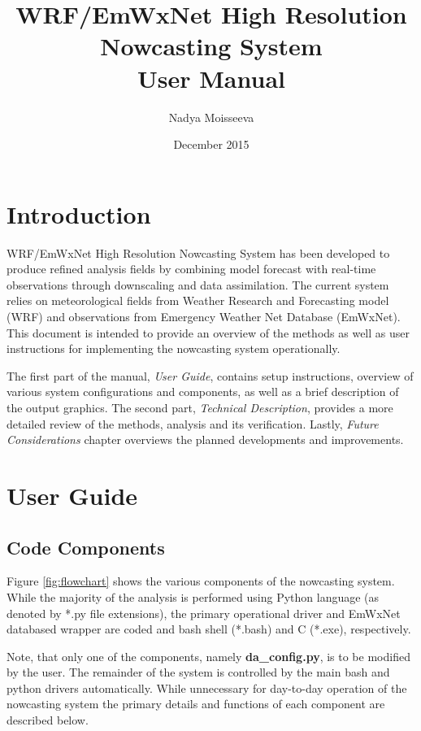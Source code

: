 \documentclass{article}
\begin{document}
\title{WRF/EmWxNet High Resolution Nowcasting System \\ User Manual}
\author{Nadya Moisseeva}
\date{December 2015}    %

\maketitle
\tableofcontents

\newpage
\section*{Introduction}

WRF/EmWxNet High Resolution Nowcasting System has been developed to produce refined analysis fields by combining model forecast with real-time observations through downscaling and data assimilation. The current system relies on meteorological fields from Weather Research and Forecasting model (WRF) and observations from Emergency Weather Net Database (EmWxNet). This document is intended to provide an overview of the methods as well as user instructions for implementing the nowcasting system operationally. 

The first part of the manual, \emph{User Guide}, contains setup instructions, overview of various system configurations and components, as well as a brief description of the output graphics. The second part, \emph{Technical Description}, provides a more detailed review of the methods, analysis and its verification. Lastly, \emph{Future Considerations} chapter overviews the planned developments and improvements. 

\newpage
\section{User Guide}
\subsection{Code Components}

\FloatBarrier
Figure \ref{fig:flowchart} shows the various components of the nowcasting system. While the majority of the analysis is performed using Python language (as denoted by *.py file extensions), the primary operational driver and EmWxNet databased wrapper are coded and bash shell (*.bash) and C (*.exe), respectively. 

Note, that only one of the components, namely \textbf{da\_config.py}, is to be modified by the user. The remainder of the system is controlled by the main bash and python drivers automatically. While unnecessary for day-to-day operation of the nowcasting system the primary details and functions of each component are described below. 
\end{document}
